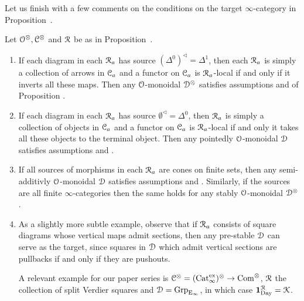 Let us finish with a few comments on the conditions on the target $\infty$-category in Proposition~.

\begin{examples}
\label{someexampleofRlocalfunctors}%
Let $\mathcal{O}^{\otimes},\mathcal C^{\otimes}$ and $\mathcal{R}$ be as in Proposition~.
\begin{enumerate}
\item If each diagram in each $\mathcal{R}_a$ has source $(\Delta^0)^\triangleleft = \Delta^1$, then each $\mathcal{R}_a$ is simply a collection of arrows in $\mathcal C_a$ and a functor on $\mathcal C_a$ %
is $\mathcal{R}_a$-local if and only if it inverts all these maps. Then any $\mathcal{O}$-monoidal $\mathcal{D}^{\otimes}$ satisfies assumptions  and  of Proposition .
\item If each diagram in each $\mathcal{R}_a$ has source $\emptyset^\triangleleft = \Delta^0$, then $\mathcal{R}_a$ is simply a collection of objects in $\mathcal C_a$ and a functor on $\mathcal C_a$ is $\mathcal{R}_a$-local if and only it takes all these objects to the terminal object. %
Then any pointedly $\mathcal{O}$-monoidal $\mathcal{D}$ satisfies assumptions  and . %
\item If all sources of morphisms in each $\mathcal{R}_a$ are cones on finite sets, then any semi-additivly $\mathcal{O}$-monoidal $\mathcal{D}$ satisfies assumptions  and . %
Similarly, if the sources are all finite $\infty$-categories then the same holds for any stably $\mathcal{O}$-monoidal $\mathcal{D}^{\otimes}$.
\item As a slightly more subtle example, observe that if $\mathcal{R}_a$ consists of square diagrams whose vertical maps admit sections, then any pre-stable $\mathcal{D}$ can serve as the target, since squares in $\mathcal{D}$ which admit vertical sections are pullbacks if and only if they are pushouts. 

A relevant example for our paper series is $\mathcal C^{\otimes} = (\mathrm{Cat}_\infty^{\mathrm{ex}})^{\otimes} \to \mathrm{Com}^{\otimes}$, $\mathcal{R}$ the collection of split Verdier squares and $\mathcal{D} = \operatorname{Grp}_{{\mathrm{E}_{\infty}}}$, in which case $\mathbf{1}_{\mathrm{Day}}^{\mathcal{R}} = \operatorname{\mathcal{K}}$.
\end{enumerate}
\end{examples}
